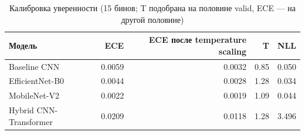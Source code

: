 \begin{table}[htbp]
\centering
\caption{Калибровка уверенности (15 бинов; T подобрана на половине valid, ECE — на другой половине)}
\label{tab:calibration}
\begin{tabular}{lrrrr}
\toprule
Модель & ECE & ECE после temperature scaling & T & NLL \\
\midrule
Baseline CNN & 0.0059 & 0.0032 & 0.85 & 0.050 \\
EfficientNet-B0 & 0.0044 & 0.0028 & 1.28 & 0.034 \\
MobileNet-V2 & 0.0022 & 0.0019 & 1.09 & 0.044 \\
Hybrid CNN-Transformer & 0.0209 & 0.0118 & 1.28 & 3.496 \\
\bottomrule
\end{tabular}
\end{table}
